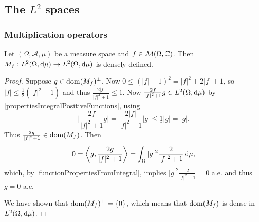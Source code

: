 \subsection{The $L^2$ spaces}

\subsubsection{Multiplication operators}
\begin{lemma} \label{multiplicationOperatorDenselyDefined}
Let $(\Omega, \mathcal{A}, \mu)$ be a measure space and $f\in \operatorname{\mathcal{M}}(\Omega, \mathbb{C})$. Then $M_f: L^2(\Omega,\operatorname{d \!}\mu)\to L^2(\Omega,\operatorname{d \!}\mu)$ is densely defined.
\end{lemma}
\begin{proof}
Suppose $g\in \operatorname{dom}(M_f)^\perp$. Now $\underline{0}\leq (|f|+1)^2 = |f|^2 + 2|f| + 1$, so $|f|\leq \frac{1}{2}(|f|^2 + 1)$ and thus $\frac{2|f|}{|f|^2 + 1} \leq \underline{1}$. Now $\frac{2f}{|f|^2 + 1}g\in L^2(\Omega,\operatorname{d \!}\mu)$ by \ref{propertiesIntegralPositiveFunctions}, using
\[ \Big|\frac{2f}{|f|^2 + 1}g\Big| = \frac{2|f|}{|f|^2 + 1}|g| \leq \underline{1}|g| = |g|. \]
Thus $\frac{2g}{|f|^2+1} \in \operatorname{dom}(M_f)$. Then
\[ 0 = \inner{g, \frac{2g}{|f|^2+1}} = \int_\Omega |g|^2 \frac{2}{|f|^2+1}\diff{\mu}, \]
which, by \ref{functionPropertiesFromIntegral}, implies $|g|^2 \frac{2}{|f|^2+1} = 0$ a.e. and thus $g = 0$ a.e.

We have shown that $\operatorname{dom}(M_f)^\perp = \{0\}$, which means that $\operatorname{dom}(M_f)$ is dense in $L^2(\Omega,\operatorname{d \!}\mu)$.
\end{proof}

